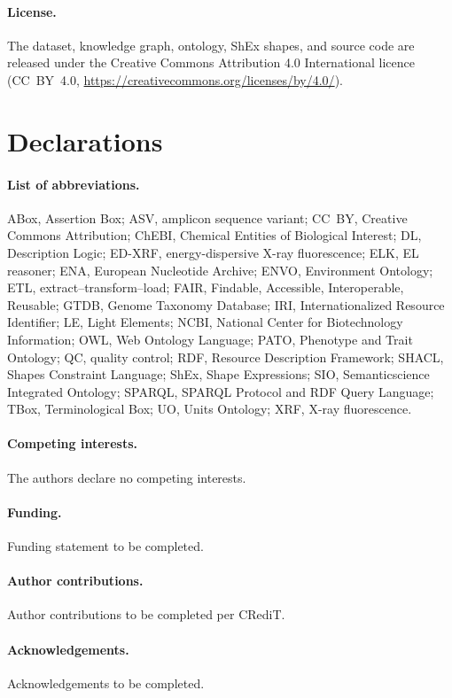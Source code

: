 \documentclass[11pt,a4paper]{article}
\begin{document}
\paragraph{License.}
The dataset, knowledge graph, ontology, ShEx shapes, and source code
are released under the Creative Commons Attribution 4.0 International
licence (CC~BY~4.0,
\url{https://creativecommons.org/licenses/by/4.0/}).

\section*{Declarations}

\paragraph{List of abbreviations.}
ABox, Assertion Box; ASV, amplicon sequence variant; CC~BY, Creative
Commons Attribution; ChEBI, Chemical Entities of Biological Interest;
DL, Description Logic; ED-XRF, energy-dispersive X-ray
fluorescence; ELK, EL reasoner; ENA, European Nucleotide Archive;
ENVO, Environment Ontology; ETL, extract--transform--load; FAIR,
Findable, Accessible, Interoperable, Reusable; GTDB, Genome
Taxonomy Database; IRI, Internationalized Resource Identifier;
LE, Light Elements; NCBI, National Center for Biotechnology
Information; OWL, Web Ontology Language; PATO, Phenotype and Trait
Ontology; QC, quality control; RDF, Resource Description Framework;
SHACL, Shapes Constraint Language; ShEx, Shape Expressions; SIO,
Semanticscience Integrated Ontology; SPARQL, SPARQL Protocol and
RDF Query Language; TBox, Terminological Box; UO, Units Ontology;
XRF, X-ray fluorescence.

\paragraph{Competing interests.}
The authors declare no competing interests.

\paragraph{Funding.}
Funding statement to be completed.

\paragraph{Author contributions.}
Author contributions to be completed per CRediT.

\paragraph{Acknowledgements.}
Acknowledgements to be completed.



\end{document}

